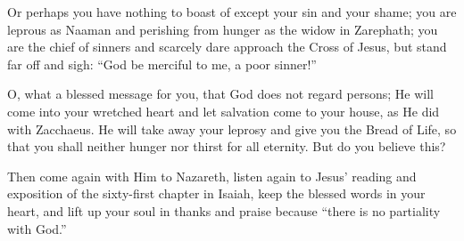 Or perhaps you have nothing to boast of except your sin and your shame; you are leprous as Naaman and perishing from hunger as the widow in Zarephath; you are the chief of sinners and scarcely dare approach the Cross of Jesus, but stand far off and sigh: “God be merciful to me, a poor sinner!”

O, what a blessed message for you, that God does not regard persons; He will come into your wretched heart and let salvation come to your house, as He did with Zacchaeus. He will take away your leprosy and give you the Bread of Life, so that you shall neither hunger nor thirst for all eternity. But do you believe this?

Then come again with Him to Nazareth, listen again to Jesus’ reading and exposition of the sixty-first chapter in Isaiah, keep the blessed words in your heart, and lift up your soul in thanks and praise because “there is no partiality with God.”

